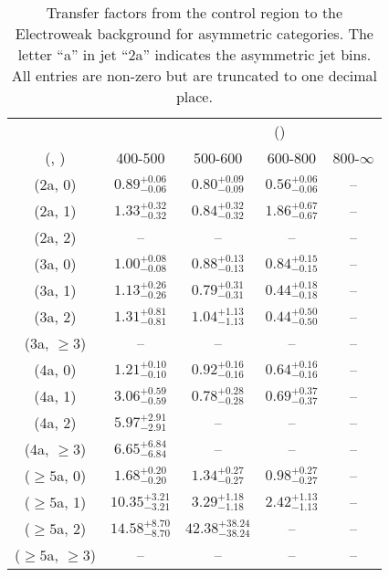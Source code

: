 \begin{table}[h!]
\tiny
\centering
\caption{Transfer factors from the \gj control region to the Electroweak background for asymmetric categories. The letter ``a'' in jet \eg ``2a''  indicates the asymmetric jet bins. All entries are non-zero but are truncated to one decimal place.\label{tab:tf_gj_total_asym}}
\begin{tabular}
{ccccc}
	\hline\hline
&	& \multicolumn{4}{c}{\scalht (\gev)} \\ 
	 (\njet,  \nb) & 400-500 & 500-600 & 600-800 & 800-$\infty$ \\ [0.8ex] 
\hline
	(2a, 0) & $0.89^{+ 0.06 }_{- 0.06 }$ & $0.80^{+ 0.09 }_{- 0.09 }$ & $0.56^{+ 0.06 }_{- 0.06 }$ & -- \\[0.5ex] 
	(2a, 1) & $1.33^{+ 0.32 }_{- 0.32 }$ & $0.84^{+ 0.32 }_{- 0.32 }$ & $1.86^{+ 0.67 }_{- 0.67 }$ & -- \\[0.5ex] 
	(2a, 2) & -- & -- & -- & -- \\[0.5ex] 
	(3a, 0) & $1.00^{+ 0.08 }_{- 0.08 }$ & $0.88^{+ 0.13 }_{- 0.13 }$ & $0.84^{+ 0.15 }_{- 0.15 }$ & -- \\[0.5ex] 
	(3a, 1) & $1.13^{+ 0.26 }_{- 0.26 }$ & $0.79^{+ 0.31 }_{- 0.31 }$ & $0.44^{+ 0.18 }_{- 0.18 }$ & -- \\[0.5ex] 
	(3a, 2) & $1.31^{+ 0.81 }_{- 0.81 }$ & $1.04^{+ 1.13 }_{- 1.13 }$ & $0.44^{+ 0.50 }_{- 0.50 }$ & -- \\[0.5ex] 
	(3a, $\ge3$) & -- & -- & -- & -- \\[0.5ex] 
	(4a, 0) & $1.21^{+ 0.10 }_{- 0.10 }$ & $0.92^{+ 0.16 }_{- 0.16 }$ & $0.64^{+ 0.16 }_{- 0.16 }$ & -- \\[0.5ex] 
	(4a, 1) & $3.06^{+ 0.59 }_{- 0.59 }$ & $0.78^{+ 0.28 }_{- 0.28 }$ & $0.69^{+ 0.37 }_{- 0.37 }$ & -- \\[0.5ex] 
	(4a, 2) & $5.97^{+ 2.91 }_{- 2.91 }$ & -- & -- & -- \\[0.5ex] 
	(4a, $\ge3$) & $6.65^{+ 6.84 }_{- 6.84 }$ & -- & -- & -- \\[0.5ex] 
	($\ge5$a, 0) & $1.68^{+ 0.20 }_{- 0.20 }$ & $1.34^{+ 0.27 }_{- 0.27 }$ & $0.98^{+ 0.27 }_{- 0.27 }$ & -- \\[0.5ex] 
	($\ge5$a, 1) & $10.35^{+ 3.21 }_{- 3.21 }$ & $3.29^{+ 1.18 }_{- 1.18 }$ & $2.42^{+ 1.13 }_{- 1.13 }$ & -- \\[0.5ex] 
	($\ge5$a, 2) & $14.58^{+ 8.70 }_{- 8.70 }$ & $42.38^{+ 38.24 }_{- 38.24 }$ & -- & -- \\[0.5ex] 
	($\ge5$a, $\ge3$) & -- & -- & -- & -- \\[0.5ex] 
	\hline
	\hline
\end{tabular}
\end{table}
